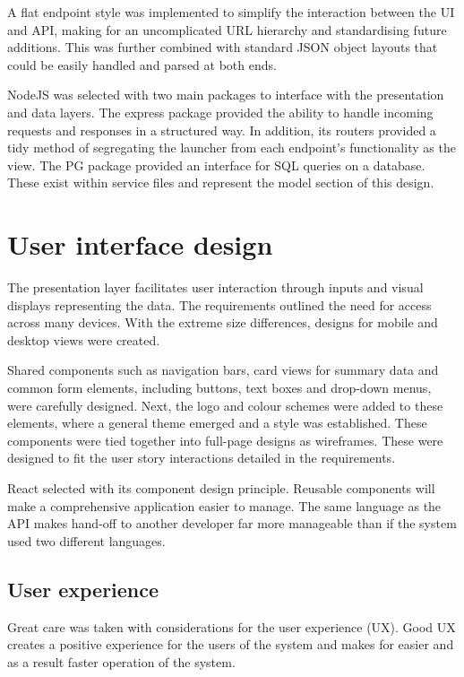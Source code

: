 A flat endpoint style was implemented to simplify the interaction between the UI and API, making for an uncomplicated URL hierarchy and standardising future additions. This was further combined with standard JSON object layouts that could be easily handled and parsed at both ends.

NodeJS was selected with two main packages to interface with the presentation and data layers. The express package provided the ability to handle incoming requests and responses in a structured way. In addition, its routers provided a tidy method of segregating the launcher from each endpoint's functionality as the view. The PG package provided an interface for SQL queries on a database. These exist within service files and represent the model section of this design.


\section{User interface design}

The presentation layer facilitates user interaction through inputs and visual displays representing the data. The requirements outlined the need for access across many devices. With the extreme size differences, designs for mobile and desktop views were created.

Shared components such as navigation bars, card views for summary data and common form elements, including buttons, text boxes and drop-down menus, were carefully designed. Next, the logo and colour schemes were added to these elements, where a general theme emerged and a style was established. These components were tied together into full-page designs as wireframes. These were designed to fit the user story interactions detailed in the requirements.

React selected with its component design principle. Reusable components will make a comprehensive application easier to manage. The same language as the API makes hand-off to another developer far more manageable than if the system used two different languages.

\subsection{User experience}
Great care was taken with considerations for the user experience (UX). Good UX creates a positive experience for the users of the system \parencite{yablonski_home_nodate} and makes for easier and as a result faster operation of the system.

